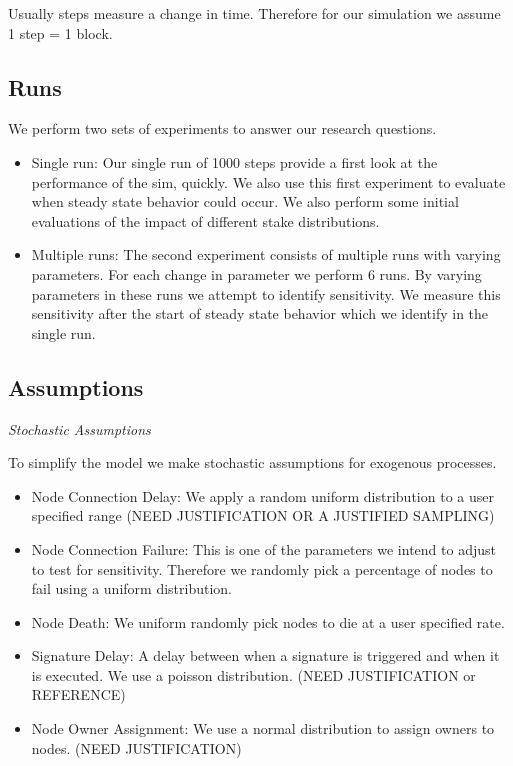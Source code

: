 \documentclass[conference]{IEEEtran}
\begin{document}
Usually steps measure a change in time. Therefore for our simulation we assume
1 step = 1 block.

\subsection{Runs}
We perform two sets of experiments to answer our research questions. 
\begin{itemize}

\item Single run: Our single run of 1000 steps provide a first look at the 
performance of the sim, quickly. We also use this first experiment to evaluate
when steady state behavior could occur. We also perform some initial evaluations
of the impact of different stake distributions.

\item Multiple runs: The second experiment consists of multiple runs with varying 
parameters. For each change in parameter we perform 6 runs. By varying parameters 
in these runs we attempt to identify sensitivity. We measure this sensitivity after
the start of steady state behavior which we identify in the single run. 
    
\end{itemize}

\subsection{Assumptions}

\textit{Stochastic Assumptions}

To simplify the model we make stochastic assumptions for exogenous processes.

\begin{itemize}

\item Node Connection Delay: We apply a random uniform distribution to a user specified range (NEED JUSTIFICATION OR A JUSTIFIED SAMPLING)
\item Node Connection Failure: This is one of the parameters we intend to adjust to test for sensitivity. Therefore we
randomly pick a percentage of nodes to fail using a uniform distribution.
\item Node Death: We uniform randomly pick nodes to die at a user specified rate.
\item Signature Delay: A delay between when a signature is triggered and when it is executed. We use a poisson distribution. (NEED JUSTIFICATION or REFERENCE)
\item Node Owner Assignment: We use a normal distribution to assign owners to nodes. (NEED JUSTIFICATION)
\end{itemize}
\end{document}
